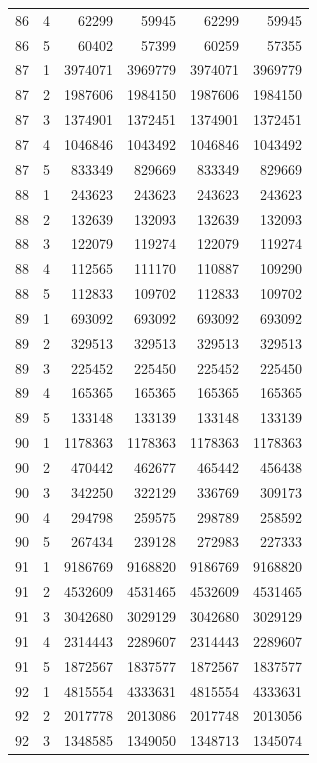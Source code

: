 \begin{longtable}{rrrrrr}
86 & 4 & 62299 & 59945 & 62299 & 59945 \\
86 & 5 & 60402 & 57399 & 60259 & 57355 \\
87 & 1 & 3974071 & 3969779 & 3974071 & 3969779 \\
87 & 2 & 1987606 & 1984150 & 1987606 & 1984150 \\
87 & 3 & 1374901 & 1372451 & 1374901 & 1372451 \\
87 & 4 & 1046846 & 1043492 & 1046846 & 1043492 \\
87 & 5 & 833349 & 829669 & 833349 & 829669 \\
88 & 1 & 243623 & 243623 & 243623 & 243623 \\
88 & 2 & 132639 & 132093 & 132639 & 132093 \\
88 & 3 & 122079 & 119274 & 122079 & 119274 \\
88 & 4 & 112565 & 111170 & 110887 & 109290 \\
88 & 5 & 112833 & 109702 & 112833 & 109702 \\
89 & 1 & 693092 & 693092 & 693092 & 693092 \\
89 & 2 & 329513 & 329513 & 329513 & 329513 \\
89 & 3 & 225452 & 225450 & 225452 & 225450 \\
89 & 4 & 165365 & 165365 & 165365 & 165365 \\
89 & 5 & 133148 & 133139 & 133148 & 133139 \\
90 & 1 & 1178363 & 1178363 & 1178363 & 1178363 \\
90 & 2 & 470442 & 462677 & 465442 & 456438 \\
90 & 3 & 342250 & 322129 & 336769 & 309173 \\
90 & 4 & 294798 & 259575 & 298789 & 258592 \\
90 & 5 & 267434 & 239128 & 272983 & 227333 \\
91 & 1 & 9186769 & 9168820 & 9186769 & 9168820 \\
91 & 2 & 4532609 & 4531465 & 4532609 & 4531465 \\
91 & 3 & 3042680 & 3029129 & 3042680 & 3029129 \\
91 & 4 & 2314443 & 2289607 & 2314443 & 2289607 \\
91 & 5 & 1872567 & 1837577 & 1872567 & 1837577 \\
92 & 1 & 4815554 & 4333631 & 4815554 & 4333631 \\
92 & 2 & 2017778 & 2013086 & 2017748 & 2013056 \\
92 & 3 & 1348585 & 1349050 & 1348713 & 1345074 \\

\end{longtable}
